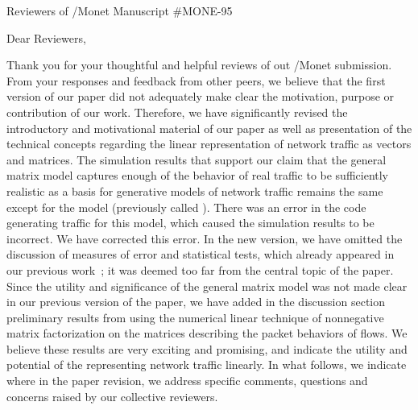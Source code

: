 \documentclass{letter}
\begin{document}
\begin{letter}{Reviewers of /Monet Manuscript \#MONE-95}

\opening{Dear Reviewers,}

Thank you for your thoughtful and helpful reviews of out /Monet submission.
From your responses and feedback from other peers, we believe that the first version of our paper did not adequately make clear the motivation, purpose or contribution of our work.
Therefore, we have significantly revised the introductory and motivational material of our paper as well as presentation of the technical concepts regarding the linear representation of network traffic as vectors and matrices.
The simulation results that support our claim that the general matrix model captures enough of the behavior of real traffic to be sufficiently realistic as a basis for generative models of network traffic remains the same except for the  model (previously called ).
There was an error in the code generating traffic for this model, which caused the simulation results to be incorrect.
We have corrected this error.
In the new version, we have omitted the discussion of measures of error and statistical tests, which already appeared in our previous work~\cite{Karpinski07:cbr-failure}; it was deemed too far from the central topic of the paper.
Since the utility and significance of the general matrix model was not made clear in our previous version of the paper, we have added in the discussion section preliminary results from using the numerical linear technique of nonnegative matrix factorization on the  matrices describing the packet behaviors of flows.
We believe these results are very exciting and promising, and indicate the utility and potential of the representing network traffic linearly.
In what follows, we indicate where in the paper revision, we address specific comments, questions and concerns raised by our collective reviewers.

\begin{enumerate}


\end{enumerate}
\end{letter}
\end{document}
